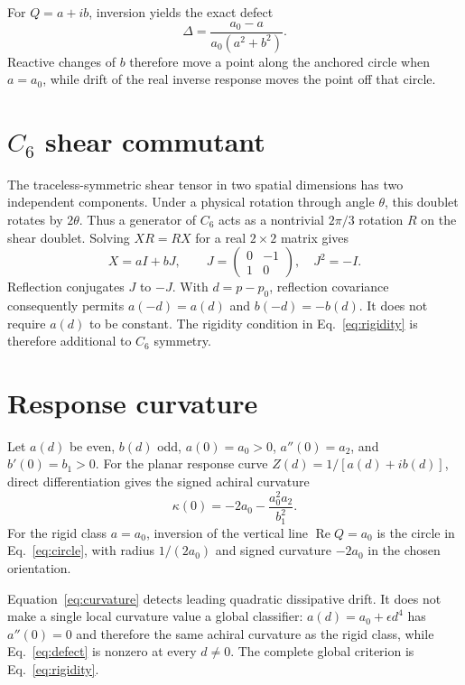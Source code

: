 \documentclass[11pt]{article}
\newcommand{\Ree}{\operatorname{Re}}
\begin{document}
For $Q=a+ib$, inversion yields the exact defect
\begin{equation}
 \Delta=\frac{a_0-a}{a_0(a^2+b^2)}.
 \label{eq:defect}
\end{equation}
Reactive changes of $b$ therefore move a point along the anchored circle when $a=a_0$, while drift of the real inverse response moves the point off that circle.

\section{$C_6$ shear commutant}
The traceless-symmetric shear tensor in two spatial dimensions has two independent components.  Under a physical rotation through angle $\theta$, this doublet rotates by $2\theta$.  Thus a generator of $C_6$ acts as a nontrivial $2\pi/3$ rotation $R$ on the shear doublet.  Solving $XR=RX$ for a real $2\times2$ matrix gives
\begin{equation}
 X=aI+bJ,\qquad J=\begin{pmatrix}0&-1\\1&0\end{pmatrix},\quad J^2=-I.
 \label{eq:commutant}
\end{equation}
Reflection conjugates $J$ to $-J$.  With $d=p-p_0$, reflection covariance consequently permits $a(-d)=a(d)$ and $b(-d)=-b(d)$.  It does not require $a(d)$ to be constant.  The rigidity condition in Eq.~\eqref{eq:rigidity} is therefore additional to $C_6$ symmetry.

\section{Response curvature}
Let $a(d)$ be even, $b(d)$ odd, $a(0)=a_0>0$, $a''(0)=a_2$, and $b'(0)=b_1>0$.  For the planar response curve $Z(d)=1/[a(d)+ib(d)]$, direct differentiation gives the signed achiral curvature
\begin{equation}
 \kappa(0)=-2a_0-\frac{a_0^2a_2}{b_1^2}.
 \label{eq:curvature}
\end{equation}
For the rigid class $a=a_0$, inversion of the vertical line $\Ree Q=a_0$ is the circle in Eq.~\eqref{eq:circle}, with radius $1/(2a_0)$ and signed curvature $-2a_0$ in the chosen orientation.

Equation~\eqref{eq:curvature} detects leading quadratic dissipative drift.  It does not make a single local curvature value a global classifier: $a(d)=a_0+\epsilon d^4$ has $a''(0)=0$ and therefore the same achiral curvature as the rigid class, while Eq.~\eqref{eq:defect} is nonzero at every $d\ne0$.  The complete global criterion is Eq.~\eqref{eq:rigidity}.
\end{document}
